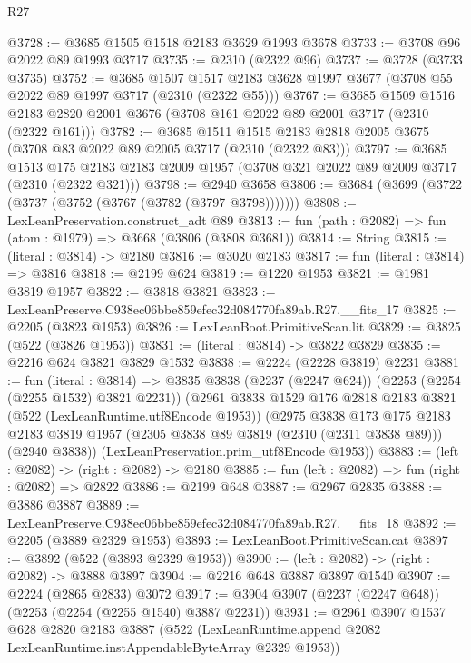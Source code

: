 \begin{lexlean}{R27}
\begin{coremodule}
@3728 := @3685 @1505 @1518 @2183 @3629 @1993 @3678
@3733 := @3708 @96 @2022 @89 @1993 @3717
@3735 := @2310 (@2322 @96)
@3737 := @3728 (@3733 @3735)
@3752 := @3685
    @1507
    @1517
    @2183
    @3628
    @1997
    @3677
    (@3708 @55 @2022 @89 @1997 @3717 (@2310 (@2322 @55)))
@3767 := @3685
    @1509
    @1516
    @2183
    @2820
    @2001
    @3676
    (@3708 @161 @2022 @89 @2001 @3717 (@2310 (@2322 @161)))
@3782 := @3685
    @1511
    @1515
    @2183
    @2818
    @2005
    @3675
    (@3708 @83 @2022 @89 @2005 @3717 (@2310 (@2322 @83)))
@3797 := @3685
    @1513
    @175
    @2183
    @2183
    @2009
    @1957
    (@3708 @321 @2022 @89 @2009 @3717 (@2310 (@2322 @321)))
@3798 := @2940 @3658
@3806 := @3684 (@3699 (@3722 (@3737 (@3752 (@3767 (@3782 (@3797 @3798)))))))
@3808 := LexLeanPreservation.construct_adt @89
@3813 := fun (path : @2082) => fun (atom : @1979) => @3668 (@3806 (@3808 @3681))
@3814 := String
@3815 := (literal : @3814) -> @2180
@3816 := @3020 @2183
@3817 := fun (literal : @3814) => @3816
@3818 := @2199 @624
@3819 := @1220 @1953
@3821 := @1981 @3819 @1957
@3822 := @3818 @3821
@3823 := LexLeanPreserve.C938ec06bbe859efec32d084770fa89ab.R27.__fits_17
@3825 := @2205 (@3823 @1953)
@3826 := LexLeanBoot.PrimitiveScan.lit
@3829 := @3825 (@522 (@3826 @1953))
@3831 := (literal : @3814) -> @3822 @3829
@3835 := @2216 @624 @3821 @3829 @1532
@3838 := @2224 (@2228 @3819) @2231
@3881 := fun (literal : @3814) =>
  @3835
    @3838
    (@2237 (@2247 @624))
    (@2253 (@2254 (@2255 @1532) @3821 @2231))
    (@2961
      @3838
      @1529
      @176
      @2818
      @2183
      @3821
      (@522 (LexLeanRuntime.utf8Encode @1953))
      (@2975
        @3838
        @173
        @175
        @2183
        @2183
        @3819
        @1957
        (@2305 @3838 @89 @3819 (@2310 (@2311 @3838 @89)))
        (@2940 @3838))
      (LexLeanPreservation.prim_utf8Encode @1953))
@3883 := (left : @2082) -> (right : @2082) -> @2180
@3885 := fun (left : @2082) => fun (right : @2082) => @2822
@3886 := @2199 @648
@3887 := @2967 @2835
@3888 := @3886 @3887
@3889 := LexLeanPreserve.C938ec06bbe859efec32d084770fa89ab.R27.__fits_18
@3892 := @2205 (@3889 @2329 @1953)
@3893 := LexLeanBoot.PrimitiveScan.cat
@3897 := @3892 (@522 (@3893 @2329 @1953))
@3900 := (left : @2082) -> (right : @2082) -> @3888 @3897
@3904 := @2216 @648 @3887 @3897 @1540
@3907 := @2224 (@2865 @2833) @3072
@3917 := @3904 @3907 (@2237 (@2247 @648)) (@2253 (@2254 (@2255 @1540) @3887 @2231))
@3931 := @2961
    @3907
    @1537
    @628
    @2820
    @2183
    @3887
    (@522 (LexLeanRuntime.append @2082 LexLeanRuntime.instAppendableByteArray @2329 @1953))

\end{coremodule}
\end{lexlean}
